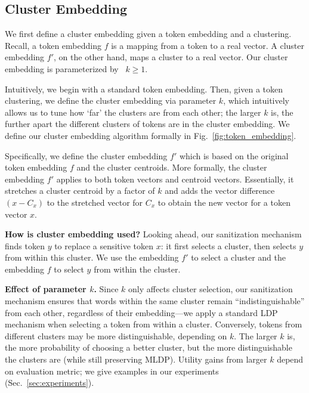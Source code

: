 \subsection{Cluster Embedding}\label{sec:token_embedding}

We first define a cluster embedding given a token embedding and a clustering. Recall, a token embedding $f$ is a mapping from a token to a real vector. A cluster embedding $f'$, on the other hand, maps a cluster to a real vector. Our cluster embedding is parameterized by ~\( k \geq 1 \).

Intuitively, we begin with a standard token embedding. Then, given a token clustering, we define the cluster embedding via parameter \( k \),  which intuitively allows us to tune how `far' the clusters are from each other; the larger \( k \) is, the further apart the different clusters of tokens are in the cluster embedding. We define our cluster embedding algorithm formally in Fig.~\ref{fig:token_embedding}.

Specifically, we define the cluster embedding \( f' \) which is based on the original token embedding \( f \) and the cluster centroids. 
More formally, the cluster embedding \( f' \) applies to both token vectors and centroid vectors. Essentially, it stretches a cluster centroid by a factor of \( k \) and adds the vector difference \( (x - C_x) \) to the stretched vector for \( C_x \) to obtain the new vector for a token vector \( x \).

\noindent
\textbf{How is cluster embedding used? } %
Looking ahead, our sanitization mechanism finds token \( y \) to replace a sensitive token \( x \): it first selects a cluster, then  selects \( y \) from within this cluster. We use the embedding \( f' \) to select a cluster and the embedding \( f \) to select \( y \) from within the cluster. 

\noindent
\textbf{Effect of parameter $k$. }
Since $k$ only affects cluster selection, our sanitization mechanism ensures that words within the same cluster  remain  ``indistinguishable'' from each other, regardless of their embedding---we apply a standard LDP mechanism when selecting a token from within a cluster. 
Conversely, tokens from different clusters may be more distinguishable, 
depending on \( k \). %
The larger $k$ is, the more probability of choosing a better cluster, but the more distinguishable the clusters are (while still preserving MLDP). Utility gains from larger $k$  depend on evaluation metric; we give examples in our experiments (Sec.~\ref{sec:experiments}). %

